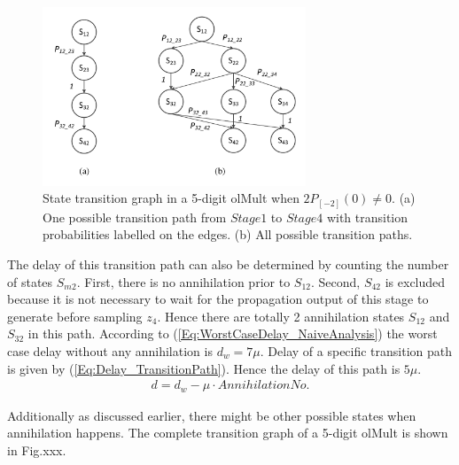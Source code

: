 \documentclass[a4paper, 11pt]{article}
\begin{document}
\begin{figure}[tbp]
  \centering
  \includegraphics[width=0.7\textwidth]{./Figures/OlMult_TimingGraph.pdf}
  \caption{State transition graph in a 5-digit olMult when $2P_{[-2]}(0)\neq0$. (a) One possible transition path from $Stage1$ to $Stage4$ with transition probabilities labelled on the edges. (b) All possible transition paths.}
\end{figure}

The delay of this transition path can also be determined by counting the number of states $S_{m2}$. First, there is no annihilation prior to $S_{12}$. Second, $S_{42}$ is excluded because it is not necessary to wait for the propagation output of this stage to generate before sampling $z_4$. Hence there are totally 2 annihilation states $S_{12}$ and $S_{32}$ in this path. According to (\ref{Eq:WorstCaseDelay_NaiveAnalysis}) the worst case delay without any annihilation is $d_w=7\mu$. Delay of a specific transition path is given by (\ref{Eq:Delay_TransitionPath}). Hence the delay of this path is $5\mu$.
%
\begin{eqnarray}\label{Eq:Delay_TransitionPath}
  d = d_w - \mu\cdot AnnihilationNo.  
\end{eqnarray}

Additionally as discussed earlier, there might be other possible states when annihilation happens. The complete transition graph of a 5-digit olMult is shown in Fig.xxx.


 
\end{document}
